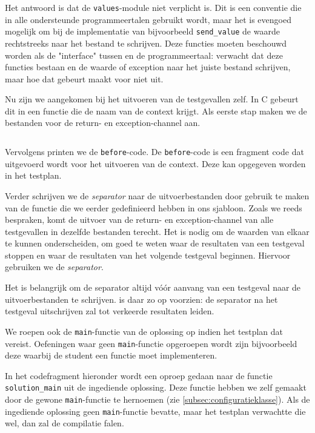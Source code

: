 Het antwoord is dat de \texttt{values}-module niet verplicht is.
Dit is een conventie die in alle ondersteunde programmeertalen gebruikt wordt, maar het is evengoed mogelijk om bij de implementatie van bijvoorbeeld \texttt{send\_value} de waarde rechtstreeks naar het bestand te schrijven.
Deze functies moeten beschouwd worden als de "interface" tussen \tested{} en de programmeertaal: \tested{} verwacht dat deze functies bestaan en de waarde of exception naar het juiste bestand schrijven, maar hoe dat gebeurt maakt voor \tested{} niet uit.

Nu zijn we aangekomen bij het uitvoeren van de testgevallen zelf.
In C gebeurt dit in een functie die de naam van de context krijgt.
Als eerste stap maken we de bestanden voor de return- en exception-channel aan.

\inputminted[firstline=33,lastline=36]{mako}{sources/c-context.mako}

Vervolgens printen we de \texttt{before}-code.
De \texttt{before}-code is een fragment code dat uitgevoerd wordt voor het uitvoeren van de context.
Deze kan opgegeven worden in het testplan.

Verder schrijven we de \emph{separator} naar de uitvoerbestanden door gebruik te maken van de functie die we eerder gedefinieerd hebben in ons sjabloon.
Zoals we reeds bespraken, komt de uitvoer van de return- en exception-channel van alle testgevallen in dezelfde bestanden terecht.
Het is nodig om de waarden van elkaar te kunnen onderscheiden, om goed te weten waar de resultaten van een testgeval stoppen en waar de resultaten van het volgende testgeval beginnen.
Hiervoor gebruiken we de \emph{separator}.

Het is belangrijk om de separator altijd vóór aanvang van een testgeval naar de uitvoerbestanden te schrijven.
\tested{} is daar zo op voorzien: de separator na het testgeval uitschrijven zal tot verkeerde resultaten leiden.

We roepen ook de \texttt{main}-functie van de oplossing op indien het testplan dat vereist.
Oefeningen waar geen \texttt{main}-functie opgeroepen wordt zijn bijvoorbeeld deze waarbij de student een functie moet implementeren.

In het codefragment hieronder wordt een oproep gedaan naar de functie \texttt{solution\_main} uit de ingediende oplossing.
Deze functie hebben we zelf gemaakt door de gewone \texttt{main}-functie te hernoemen (zie \cref{subsec:configuratieklasse}).
Als de ingediende oplossing geen \texttt{main}-functie bevatte, maar het testplan verwachtte die wel, dan zal de compilatie falen.

